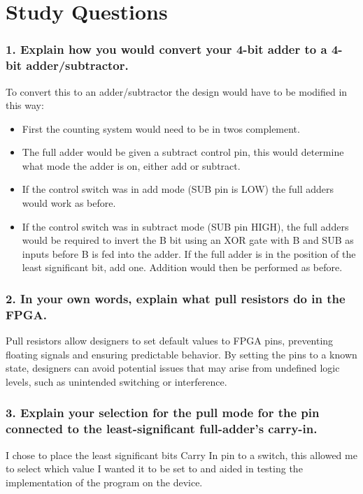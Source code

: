 \documentclass[11pt]{article}
\begin{document}
\section*{\textcolor{mycolor}{Study Questions}}
\subsubsection*{\textcolor{mycolor}{1. Explain how you would convert your 4-bit adder to a 4-bit adder/subtractor.}}
To convert this to an adder/subtractor the design would have to be modified in this way:
\begin{itemize}
    \item First the counting system would need to be in twos complement. 
    \item The full adder would be given a subtract control pin, this would determine what mode the adder is on, either add or subtract.
    \item If the control switch was in add mode (SUB pin is LOW) the full adders would work as before.
    \item If the control switch was in subtract mode (SUB pin HIGH), the full adders would be required to invert the B bit using an XOR gate with B and SUB as inputs before B is fed into the adder. If the full adder is in the position of the least significant bit, add one. Addition would then be performed as before.
\end{itemize}

\subsubsection*{\textcolor{mycolor}{2. In your own words, explain what pull resistors do in the FPGA.}}
Pull resistors allow designers to set default values to FPGA pins, preventing floating signals and ensuring predictable behavior. By setting the pins to a known state, designers can avoid potential issues that may arise from undefined logic levels, such as unintended switching or interference. 
\subsubsection*{\textcolor{mycolor}{3. Explain your selection for the pull mode for the pin connected to the least-significant full-adder's carry-in.}}
I chose to place the least significant bits Carry In pin to a switch, this allowed me to select which value I wanted it to be set to and aided in testing the implementation of the program on the device. 
\end{document}
